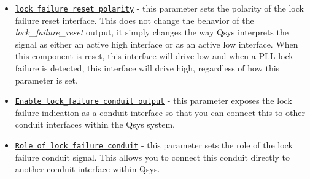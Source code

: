 \documentclass{article}
\begin{document}
\begin{flushleft}
\begin{itemize}
\item \texttt{\underline{lock\_failure reset polarity}} - this parameter sets the polarity of the lock failure reset interface.  This does not change the behavior of the \emph{lock\_failure\_reset} output, it simply changes the way Qsys interprets the signal as either an active high  interface or as an active low  interface.  When this component is reset, this interface will drive low and when a PLL lock failure is detected, this interface will drive high, regardless of how this parameter is set.

\item \texttt{\underline{Enable lock\_failure conduit output}} - this parameter exposes the lock failure indication as a conduit interface so that you can connect this to other conduit interfaces within the Qsys system.

\item \texttt{\underline{Role of lock\_failure conduit}} - this parameter sets the role of the lock failure conduit signal.  This allows you to connect this conduit directly to another conduit interface within Qsys.

\end{itemize}

\end{flushleft}

\end{document}
